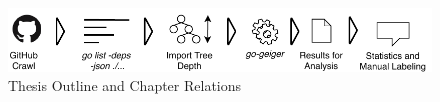 \begin{figure}[ht]
    \includegraphics[width=\textwidth]{assets/figures/chapter1/outline.pdf}
    \caption{Thesis Outline and Chapter Relations}
    \label{fig:outline}
\end{figure}
